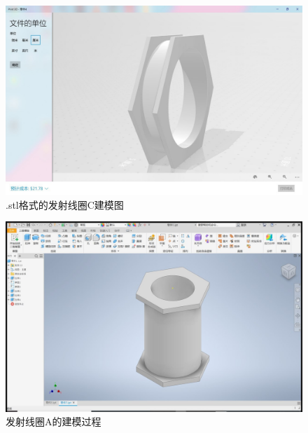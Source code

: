 \documentclass[conference]{IEEEtran}
\theoremstyle{break}
\begin{document}
\begin{figure}[htbp]
        \centerline{\includegraphics[scale=0.1]{发射线圈1.png}}
        \caption{.stl格式的发射线圈C建模图}
        \label{fig}
        \end{figure}
\begin{figure}[htbp]
        \centerline{\includegraphics[scale=0.1]{发射线圈2.png}}
        \caption{发射线圈A的建模过程}
        \label{fig}
        \end{figure}
\end{document}
